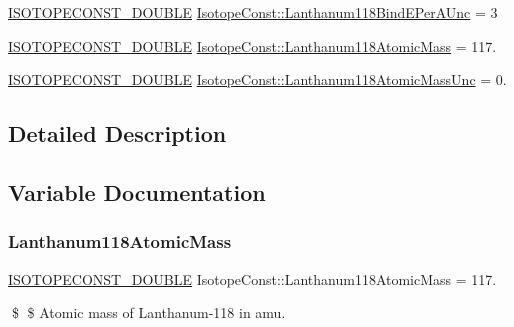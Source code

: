 \begin{DoxyCompactItemize}
\mbox{\hyperlink{group___isotope_const-_macros_ga8f45a7272ce02c0b4c65c44636ed719a}{I\+S\+O\+T\+O\+P\+E\+C\+O\+N\+S\+T\+\_\+\+D\+O\+U\+B\+LE}} \mbox{\hyperlink{group___isotope_const-_lanthanum-_la118_ga7a64fe8a43d00f7608b208be27892326}{Isotope\+Const\+::\+Lanthanum118\+Bind\+E\+Per\+A\+Unc}} = 3
\item 
\mbox{\hyperlink{group___isotope_const-_macros_ga8f45a7272ce02c0b4c65c44636ed719a}{I\+S\+O\+T\+O\+P\+E\+C\+O\+N\+S\+T\+\_\+\+D\+O\+U\+B\+LE}} \mbox{\hyperlink{group___isotope_const-_lanthanum-_la118_gae94297a2f66371d9d83ce5ca9de52a77}{Isotope\+Const\+::\+Lanthanum118\+Atomic\+Mass}} = 117.
\item 
\mbox{\hyperlink{group___isotope_const-_macros_ga8f45a7272ce02c0b4c65c44636ed719a}{I\+S\+O\+T\+O\+P\+E\+C\+O\+N\+S\+T\+\_\+\+D\+O\+U\+B\+LE}} \mbox{\hyperlink{group___isotope_const-_lanthanum-_la118_ga321092c24970f0f9ac797a3b2c6d6604}{Isotope\+Const\+::\+Lanthanum118\+Atomic\+Mass\+Unc}} = 0.
\end{DoxyCompactItemize}


\subsection{Detailed Description}


\subsection{Variable Documentation}
\mbox{\label{group___isotope_const-_lanthanum-_la118_gae94297a2f66371d9d83ce5ca9de52a77}} 
\subsubsection{\texorpdfstring{Lanthanum118\+Atomic\+Mass}{Lanthanum118AtomicMass}}
{\footnotesize\ttfamily \mbox{\hyperlink{group___isotope_const-_macros_ga8f45a7272ce02c0b4c65c44636ed719a}{I\+S\+O\+T\+O\+P\+E\+C\+O\+N\+S\+T\+\_\+\+D\+O\+U\+B\+LE}} Isotope\+Const\+::\+Lanthanum118\+Atomic\+Mass = 117.}

\$ \$ Atomic mass of Lanthanum-\/118 in amu. \mbox{\label{group___isotope_const-_lanthanum-_la118_ga321092c24970f0f9ac797a3b2c6d6604}} 
